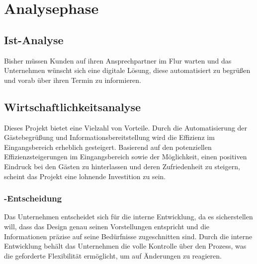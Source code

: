 \section{Analysephase} 
\label{sec:Analysephase}


\subsection{Ist-Analyse} 
\label{sec:IstAnalyse}
Bisher müssen Kunden auf ihren Ansprechpartner im Flur warten und das Unternehmen wünscht sich eine digitale Lösung, diese automatisiert zu begrüßen und vorab über ihren Termin zu informieren.


\subsection{Wirtschaftlichkeitsanalyse}
\label{sec:Wirtschaftlichkeitsanalyse}
Dieses Projekt bietet eine Vielzahl von Vorteile.
Durch die Automatisierung der Gästebegrüßung und Informationsbereitstellung wird die Effizienz im Eingangsbereich erheblich gesteigert.
Basierend auf den potenziellen Effizienzsteigerungen im Eingangsbereich sowie der Möglichkeit, einen positiven Eindruck bei den Gästen zu hinterlassen und deren Zufriedenheit zu steigern, scheint das Projekt eine lohnende Investition zu sein.


\subsubsection{-Entscheidung}
\label{sec:MakeOrBuyEntscheidung}
Das Unternehmen entscheidet sich für die interne Entwicklung, da es sicherstellen will, dass das Design genau seinen Vorstellungen entspricht und die Informationen präzise auf seine Bedürfnisse zugeschnitten sind.
Durch die interne Entwicklung behält das Unternehmen die volle Kontrolle über den Prozess, was die geforderte Flexibilität ermöglicht, um auf Änderungen zu reagieren.


